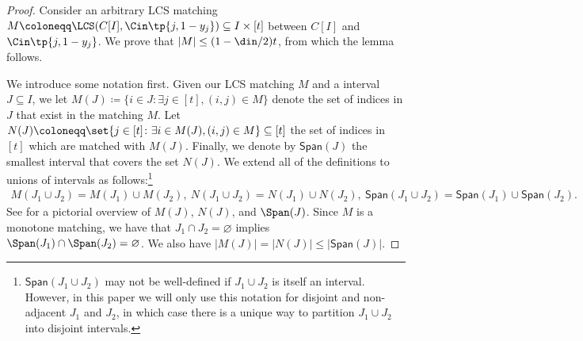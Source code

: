 \begin{proof}
Consider an arbitrary LCS matching $M \coloneqq \LCS(C[I], \Cin\tp{j, 1-y_j})  \subseteq I \times [t]$ between $C[I]$ and $\Cin\tp{j,1-y_j}$. 
We prove that $|M| \le (1-\din/2)t$, from which the lemma follows. 

We introduce some notation first.
Given our LCS matching $M$ and a interval $J \subseteq I$, we let $M(J) \coloneqq \{ i \in J \colon \exists j \in [t], (i,j) \in M\}$ denote the set of indices in $J$ that exist in the matching $M$. 
Let $N(J) \coloneqq \set{j \in [t] \colon \exists i \in M(J), (i,j) \in M} \subseteq [t]$ the set of indices in $[t]$ which are matched with $M(J)$. 
Finally, we denote by $\textsf{Span}(J)$ the smallest interval that covers the set $N(J)$. 
We extend all of the definitions to unions of intervals as follows:\footnote{$\textsf{Span}(J_1\cup J_2)$ may not be well-defined if $J_1\cup J_2$ is itself an interval. However, in this paper we will only use this notation for disjoint and non-adjacent $J_1$ and $J_2$, in which case there is a unique way to partition $J_1 \cup J_2$ into disjoint intervals.}
\begin{align*}
	M(J_1 \cup J_2) = M(J_1) \cup M(J_2), \ N(J_1 \cup J_2) = N(J_1) \cup N(J_2), \ \textsf{Span}(J_1 \cup J_2) = \textsf{Span}(J_1) \cup \textsf{Span}(J_2).
\end{align*}
See  for a pictorial overview of $M(J)$, $N(J)$, and $\Span(J)$.
Since $M$ is a monotone matching, we have that $J_1 \cap J_2 = \varnothing$ implies $\Span(J_1) \cap \Span(J_2) = \varnothing$.
We also have $|M(J)|=|N(J)|\le|\textsf{Span}(J)|$.


\end{proof}
